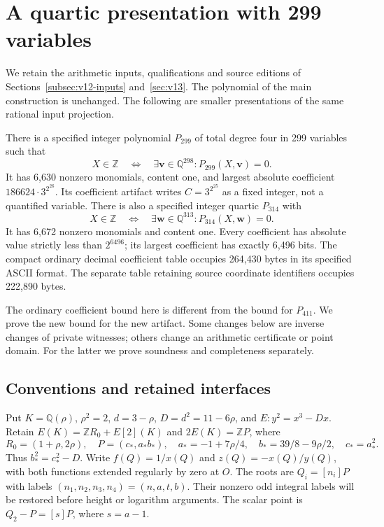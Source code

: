 \section{A quartic presentation with 299 variables}\label{sec:v14}

We retain the arithmetic inputs, qualifications and source editions of
Sections~\ref{subsec:v12-inputs} and~\ref{sec:v13}. The polynomial of
the main construction is unchanged. The following are smaller
presentations of the same rational input projection.
\begin{theorem}\label{thm:v14-quartic}
There is a specified integer polynomial $P_{299}$ of total degree four
in 299 variables such that
\[
 X\in\mathbb Z\quad\Longleftrightarrow\quad
 \exists\mathbf v\in\mathbb Q^{298}:P_{299}(X,\mathbf v)=0.
\]
It has 6,630 nonzero monomials, content one, and largest absolute
coefficient $186624\cdot3^{2^{26}}$. Its coefficient artifact writes
$C=3^{2^{25}}$ as a fixed integer, not a quantified variable.
There is also a specified integer quartic $P_{314}$ with
\[
 X\in\mathbb Z\quad\Longleftrightarrow\quad
 \exists\mathbf w\in\mathbb Q^{313}:P_{314}(X,\mathbf w)=0.
\]
It has 6,672 nonzero monomials and content one. Every coefficient has
absolute value strictly less than $2^{6496}$; its largest coefficient
has exactly 6,496 bits. The compact ordinary decimal coefficient table
occupies 264,430 bytes in its specified ASCII format. The separate table
retaining source coordinate identifiers occupies 222,890 bytes.
\end{theorem}
The ordinary coefficient bound here is different from the bound for
$P_{411}$. We prove the new bound for the new artifact. Some changes
below are inverse changes of private witnesses; others change an
arithmetic certificate or point domain. For the latter we prove
soundness and completeness separately.

\subsection{Conventions and retained interfaces}\label{subsec:v14-inputs}
Put $K=\mathbb Q(\rho)$, $\rho^2=2$, $d=3-\rho$, $D=d^2=11-6\rho$,
and $E:y^2=x^3-Dx$. Retain
$E(K)=\mathbb ZR_0+E[2](K)$ and $2E(K)=\mathbb ZP$, where
\[
 R_0=(1+\rho,2\rho),\quad P=(c_*,a_*b_*),\quad
 a_*=-1+7\rho/4,\quad b_*=39/8-9\rho/2,\quad c_*=a_*^2.
\]
Thus $b_*^2=c_*^2-D$. Write $f(Q)=1/x(Q)$ and
$z(Q)=-x(Q)/y(Q)$, with both functions extended regularly by zero
at $O$. The roots are $Q_i=[n_i]P$ with labels
$(n_1,n_2,n_3,n_4)=(n,a,t,b)$. Their nonzero odd integral labels
will be restored before height or logarithm arguments. The scalar
point is $Q_2-P=[s]P$, where $s=a-1$.

